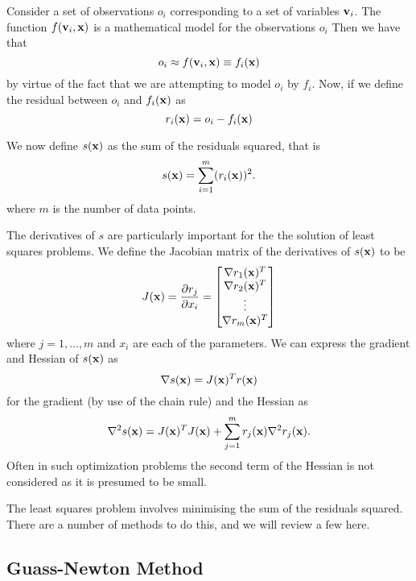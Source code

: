 Consider a set of observations $o_i$ corresponding to a set of variables $\mathbf{v}_i$. The function $f(\mathbf{v}_i, \mathbf{x})$
is a mathematical model for the observations $o_i$ Then we have that
\begin{equation}
o_i \approx f(\mathbf{v}_i, \mathbf{x}) \equiv f_i(\mathbf{x})
\end{equation}
by virtue of the fact that we are attempting to model $o_i$ by $f_i$. Now, if we define the residual
between $o_i$ and $f_i(\mathbf{x})$ as
\begin{equation}
r_i(\mathbf{x}) = o_i - f_i(\mathbf{x})
\end{equation}

We now define $s(\mathbf{x})$ as the sum of the residuals squared, that is
\begin{equation}
s(\mathbf{x}) = \sum_{i=1}^{m} (r_{i}(\mathbf{x}))^2 .
\end{equation}
where $m$ is the number of data points.

The derivatives of $s$ are particularly important for the the solution of least squares problems.
We define the Jacobian matrix of the derivatives of $s(\mathbf{x})$ to be 
\begin{equation}
J(\mathbf{x}) = \frac{\partial r_j}{\partial x_i} = \begin{bmatrix} \nabla r_1(\mathbf{x})^{T} \\ \nabla r_2(\mathbf{x})^{T} \\ \vdots \\ \nabla r_m(\mathbf{x})^{T} \end{bmatrix}
\end{equation}
where $j=1,\ldots,m$ and $x_i$ are each of the parameters. We can express the gradient and Hessian of
$s(\mathbf{x})$ as
\begin{equation}
\nabla s(\mathbf{x}) = J(\mathbf{x})^T r(\mathbf{x})
\end{equation}
for the gradient (by use of the chain rule) and the Hessian as
\begin{equation}
\nabla^2 s(\mathbf{x}) = J(\mathbf{x})^T J(\mathbf{x}) + \sum_{j=1}^{m} r_j(\mathbf{x}) \nabla^2 r_j(\mathbf{x}) .
\end{equation}
Often in such optimization problems the second term of the Hessian is not considered as it is presumed
to be small.

The least squares problem involves minimising the sum of the residuals squared. 
There are a number of methods to do this, and we will review a few here.

\subsection{Guass-Newton Method}

